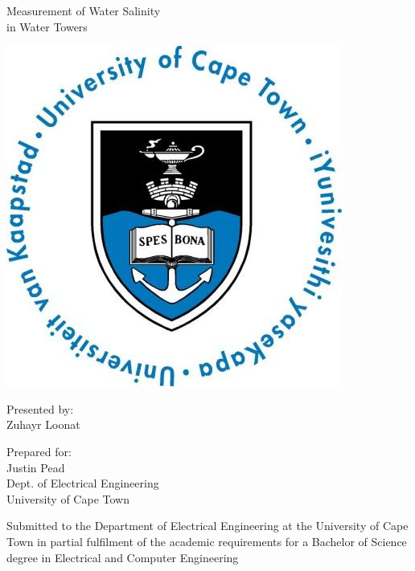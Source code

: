 \documentclass[a4paper,12pt]{report}
\begin{document}
\thispagestyle{empty}
    {\Huge \begin{center}
        Measurement of Water Salinity \\in Water Towers
    \end{center}}

    \vskip 5mm
    \begin{center}
        \includegraphics[scale = 0.35]{uctLogo.png}
    \end{center}

    \vskip 5mm
    \begin{center}
        Presented by:\\
        Zuhayr Loonat		%
    \end{center}

    \vskip 10mm
    \begin{center}
        Prepared for:\\
        Justin Pead\\ 		%
        Dept. of Electrical Engineering\\University of Cape Town
    \end{center}


    \vskip 10mm
    \begin{center}
        Submitted to the Department of Electrical Engineering at the University of Cape Town in partial
        fulfilment of the academic requirements for a Bachelor of Science degree in Electrical and Computer Engineering
    \end{center}
\end{document}
